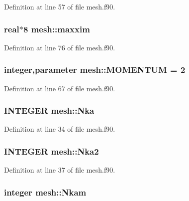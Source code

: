 Definition at line 57 of file mesh.f90.

\hypertarget{namespacemesh_aa7d7e6a7c12152ba29110facf1d664ce}{
\subsubsection[{maxxim}]{\setlength{\rightskip}{0pt plus 5cm}real$\ast$8 {\bf mesh::maxxim}}}
\label{namespacemesh_aa7d7e6a7c12152ba29110facf1d664ce}


Definition at line 76 of file mesh.f90.

\hypertarget{namespacemesh_a58029be857a15564e9ebaee23b4d887a}{
\subsubsection[{MOMENTUM}]{\setlength{\rightskip}{0pt plus 5cm}integer,parameter {\bf mesh::MOMENTUM} = 2}}
\label{namespacemesh_a58029be857a15564e9ebaee23b4d887a}


Definition at line 67 of file mesh.f90.

\hypertarget{namespacemesh_ab0bd6c4de110f0158d8a3aedd0be3907}{
\subsubsection[{Nka}]{\setlength{\rightskip}{0pt plus 5cm}INTEGER {\bf mesh::Nka}}}
\label{namespacemesh_ab0bd6c4de110f0158d8a3aedd0be3907}


Definition at line 34 of file mesh.f90.

\hypertarget{namespacemesh_abad69d3716a915fa710b7ba198f90f1b}{
\subsubsection[{Nka2}]{\setlength{\rightskip}{0pt plus 5cm}INTEGER {\bf mesh::Nka2}}}
\label{namespacemesh_abad69d3716a915fa710b7ba198f90f1b}


Definition at line 37 of file mesh.f90.

\hypertarget{namespacemesh_a910970a3de4d93dbe22c5990a246c360}{
\subsubsection[{Nkam}]{\setlength{\rightskip}{0pt plus 5cm}integer {\bf mesh::Nkam}}}
\label{namespacemesh_a910970a3de4d93dbe22c5990a246c360}


